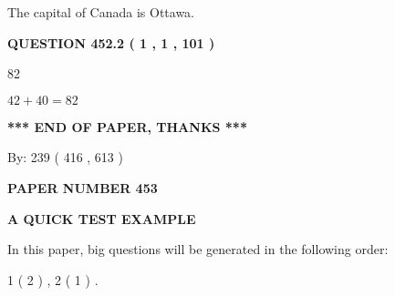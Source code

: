 \documentclass[12pt]{article}
\begin{document}
 
The capital of Canada is Ottawa.
 
 
 
 
  
\vspace{0.2in}
  
{\textbf{\Large{QUESTION
452.2 
 ( 1 , 1 , 101 )
}}}
  
  
 
 
\noindent{}

82
 
 
 
 
\noindent{}

$ %
42 +  %
40=   %
82$
 
 
   
   
 \vspace{0.2in}
 
   
   
   
   
\vspace{1.0in} 
{\textbf{\large{ *** END OF PAPER, THANKS *** }}} 
   
   
\hspace{1.0in} By: 
 239 ( 416 ,  613 )
   
   
   
   
\newpage 
\setcounter{page}{ 
   453001 } 
   
   
   
   
 {\textbf{ \Large{ PAPER NUMBER  453  }}}
   
   
\vspace{0.2in}
   
   
   
   
   
   
 \vspace{0.2in}
{\LARGE {\textbf{ A QUICK TEST EXAMPLE}}}
   
   
   
\vspace{0.2in}
   
In this paper, big questions will be generated in the following order: 
   
   
   1 ( 2 )
 ,
   2 ( 1 )
 .
  
\vspace{0.2in}
  
\end{document}
